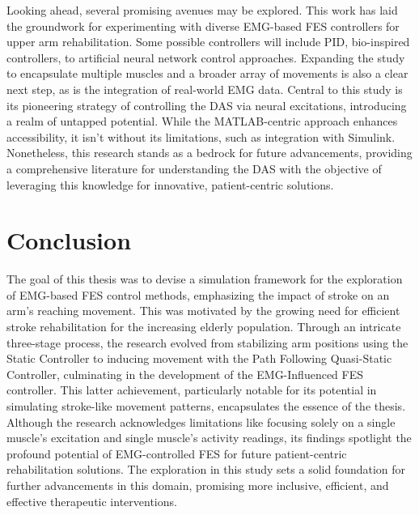 Looking ahead, several promising avenues may be explored.  This work has laid the groundwork for experimenting with diverse EMG-based FES controllers for upper arm rehabilitation. Some possible controllers will include PID, bio-inspired controllers, to artificial neural network control approaches. Expanding the study to encapsulate multiple muscles and a broader array of movements is also a clear next step, as is the integration of real-world EMG data. Central to this study is its pioneering strategy of controlling the DAS via neural excitations, introducing a realm of untapped potential. While the MATLAB-centric approach enhances accessibility, it isn't without its limitations, such as integration with Simulink. Nonetheless, this research stands as a bedrock for future advancements, providing a comprehensive literature for understanding the DAS with the objective of leveraging this knowledge for innovative, patient-centric solutions.

\chapter{Conclusion}

The goal of this thesis was to devise a simulation framework for the exploration of EMG-based FES control methods, emphasizing the impact of stroke on an arm's reaching movement. This was motivated by the growing need for efficient stroke rehabilitation for the increasing elderly population. Through an intricate three-stage process, the research evolved from stabilizing arm positions using the Static Controller to inducing movement with the Path Following Quasi-Static Controller, culminating in the development of the EMG-Influenced FES controller. This latter achievement, particularly notable for its potential in simulating stroke-like movement patterns, encapsulates the essence of the thesis. Although the research acknowledges limitations like focusing solely on a single muscle's excitation and single muscle's activity readings, its findings spotlight the profound potential of EMG-controlled FES for future patient-centric rehabilitation solutions. The exploration in this study sets a solid foundation for further advancements in this domain, promising more inclusive, efficient, and effective therapeutic interventions.